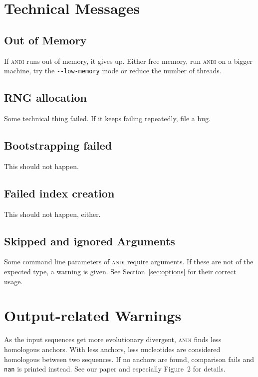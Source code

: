\documentclass[a4paper,
  10pt,
  english,
  DIV=12,
  BCOR=8mm]{scrbook}
\newcommand{\algo}[1]{\textsc{{#1}}}
\newcommand{\andi}{\algo{andi}\xspace}
\begin{document}
\section{Technical Messages}

\subsection*{Out of Memory}

If \andi runs out of memory, it gives up. Either free memory, run \andi on a bigger machine, try the \lstinline$--low-memory$ mode or reduce the number of threads.

\subsection*{RNG allocation}

Some technical thing failed. If it keeps failing repeatedly, file a bug.

\subsection*{Bootstrapping failed}

This should not happen.

\subsection*{Failed index creation}

This should not happen, either.

\subsection*{Skipped and ignored Arguments}

Some command line parameters of \andi require arguments. If these are not of the expected type, a warning is given. See Section~\ref{sec:options} for their correct usage.


\section{Output-related Warnings}

As the input sequences get more evolutionary divergent, \andi finds less homologous anchors. With less anchors, less nucleotides are considered homologous between two sequences. If no anchors are found, comparison fails and \lstinline!nan! is printed instead. See our paper and especially Figure~2 for details.
\end{document}
